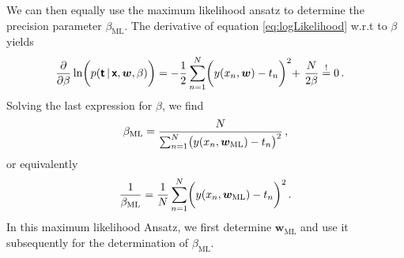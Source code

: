 \documentclass[11pt, DINA4, fleqn]{amsart}
\begin{document}
We can then equally use the maximum likelihood ansatz to determine the precision parameter $\beta_{\text{ML}}$. The derivative of equation \eqref{eq:logLikelihood} w.r.t to $\beta$ yields
\begin{align}
\dfrac{\partial}{\partial \beta} \ln\biggl(p(\boldsymbol{\mathsf{t}} \, | \, \boldsymbol{\mathsf{x}}, \bm{w}, \beta)\biggl) &= -\dfrac{1}{2}\sum\displaylimits_{n=1}^{N} \biggl(y(x_n, \bm{w}) - t_n\biggl)^2
+\,\, \dfrac{N}{2\beta} \stackrel{!}{=} 0 \, .
\end{align}
Solving the last expression for $\beta$, we find
\begin{align}
\beta_{\text{ML}} = \dfrac{N}{\sum\displaylimits_{n=1}^{N} \bigl(y(x_n, \bm{w}_{\text{ML}}) - t_n\bigl)^2} \, ,
\end{align}
or equivalently
\begin{align}
\dfrac{1}{\beta_{\text{ML}}} = \dfrac{1}{N} \sum\displaylimits_{n=1}^{N} \biggl(y(x_n, \bm{w}_{\text{ML}}) - t_n\biggl)^2 \, .
\end{align}
In this maximum likelihood Ansatz, we first determine $\bm{w}_{\text{ML}}$ and use it subsequently for the determination of $\beta_{\text{ML}}$.
\end{document}
